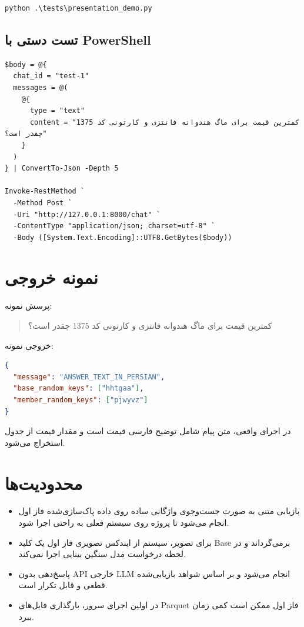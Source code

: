 \documentclass[12pt,a4paper]{article}
\newcommand{\code}[1]{\lr{\texttt{#1}}}
\begin{document}
\begin{latin}
\begin{lstlisting}
python .\tests\presentation_demo.py
\end{lstlisting}
\end{latin}

\subsection{تست دستی با PowerShell}

\begin{latin}
\begin{lstlisting}
$body = @{
  chat_id = "test-1"
  messages = @(
    @{
      type = "text"
      content = "کمترین قیمت برای ماگ هندوانه فانتزی و کارتونی کد 1375 چقدر است؟"
    }
  )
} | ConvertTo-Json -Depth 5

Invoke-RestMethod `
  -Method Post `
  -Uri "http://127.0.0.1:8000/chat" `
  -ContentType "application/json; charset=utf-8" `
  -Body ([System.Text.Encoding]::UTF8.GetBytes($body))
\end{lstlisting}
\end{latin}

\section{نمونه خروجی}

پرسش نمونه:

\begin{quote}
کمترین قیمت برای ماگ هندوانه فانتزی و کارتونی کد 1375 چقدر است؟
\end{quote}

خروجی نمونه:

\begin{latin}
\begin{lstlisting}[language=json]
{
  "message": "ANSWER_TEXT_IN_PERSIAN",
  "base_random_keys": ["hhtgaa"],
  "member_random_keys": ["pjwyvz"]
}
\end{lstlisting}
\end{latin}

در اجرای واقعی، متن پیام شامل توضیح فارسی قیمت است و مقدار قیمت از جدول \code{members\_clean.parquet} استخراج می‌شود.

\section{محدودیت‌ها}

\begin{itemize}
  \item بازیابی متنی به صورت جست‌وجوی واژگانی ساده روی داده پاک‌سازی‌شده فاز اول انجام می‌شود تا پروژه روی سیستم فعلی به راحتی اجرا شود.
  \item برای تصویر، سیستم از ایندکس تصویری فاز اول یک کلید Base برمی‌گرداند و در لحظه درخواست مدل سنگین بینایی اجرا نمی‌کند.
  \item پاسخ‌دهی بدون API خارجی LLM انجام می‌شود و بر اساس شواهد بازیابی‌شده قطعی و قابل تکرار است.
  \item در اولین اجرای سرور، بارگذاری فایل‌های Parquet فاز اول ممکن است کمی زمان ببرد.
\end{itemize}
\end{document}
